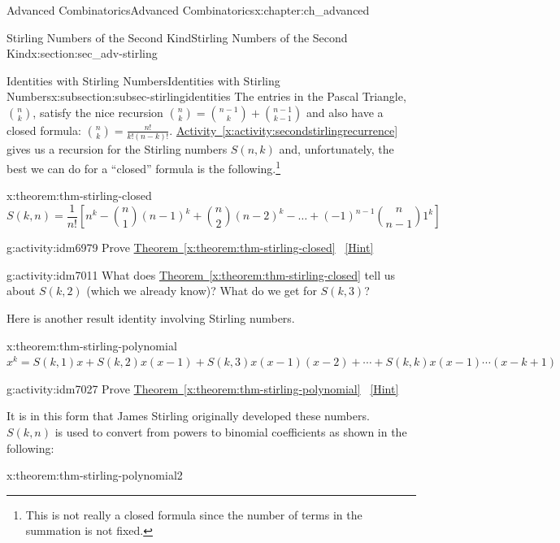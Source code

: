 \documentclass[oneside,10pt,]{book}
\numberwithin{equation}{chapter}
\begin{document}
\begin{chapterptx}{Advanced Combinatorics}{}{Advanced Combinatorics}{}{}{x:chapter:ch_advanced}
\begin{sectionptx}{Stirling Numbers of the Second Kind}{}{Stirling Numbers of the Second Kind}{}{}{x:section:sec_adv-stirling}
\begin{subsectionptx}{Identities with Stirling Numbers}{}{Identities with Stirling Numbers}{}{}{x:subsection:subsec-stirlingidentities}
The entries in the Pascal Triangle, \(\binom{n}{k}\), satisfy the nice recursion \(\binom{n}{k} = \binom{n - 1}{k} + \binom{n - 1}{k - 1}\) and also have a closed formula: \(\binom{n}{k} = \frac{n!}{k!(n - k)!}\). \hyperref[x:activity:secondstirlingrecurrence]{Activity~\ref{x:activity:secondstirlingrecurrence}} gives us a recursion for the Stirling numbers \(S(n,k)\) and, unfortunately, the best we can do for a ``closed'' formula is the following.\footnote{This is not really a closed formula since the number of terms in the summation is not fixed.\label{g:fn:idm6974}}%
\begin{theorem}{}{}{x:theorem:thm-stirling-closed}%
%
\begin{equation*}
S(k,n) = \frac{1}{n!}\left[n^{k} - \binom{n}{1} \left( n - 1 \right)^{k} + \binom{n}{2} \left( n - 2 \right)^{k} - \ldots + \left( - 1 \right)^{n - 1}\binom{n}{n - 1} 1^{k} \right] 
\end{equation*}
%
\end{theorem}
\begin{activity}{}{g:activity:idm6979}%
Prove \hyperref[x:theorem:thm-stirling-closed]{Theorem~\ref{x:theorem:thm-stirling-closed}}%
\qquad~\hfill{\tiny\hyperlink{g:hint:idm6983-back}{[Hint]}}\end{activity}
\begin{activity}{}{g:activity:idm7011}%
What does \hyperref[x:theorem:thm-stirling-closed]{Theorem~\ref{x:theorem:thm-stirling-closed}} tell us about \(S(k, 2)\) (which we already know)?  What do we get for \(S(k,3)\)?%
\end{activity}
Here is another result identity involving Stirling numbers.%
\begin{theorem}{}{}{x:theorem:thm-stirling-polynomial}%
\(x^{k} = S\left(k,1 \right)x + S\left(k,2 \right)x\left( x - 1 \right) + S\left(k,3 \right)x\left( x - 1 \right)\left( x - 2 \right) + \cdots
+ S\left(k,k \right)x\left( x - 1 \right)\cdots(x -k + 1)\)%
\end{theorem}
\begin{activity}{}{g:activity:idm7027}%
Prove \hyperref[x:theorem:thm-stirling-polynomial]{Theorem~\ref{x:theorem:thm-stirling-polynomial}}%
\qquad~\hfill{\tiny\hyperlink{g:hint:idm7031-back}{[Hint]}}\end{activity}
It is in this form that James Stirling originally developed these numbers. \(S(k,n)\) is used to convert from powers to binomial  coefficients as shown in the following:%
\begin{theorem}{}{}{x:theorem:thm-stirling-polynomial2}%

\end{theorem}
\end{subsectionptx}
\end{sectionptx}
\end{chapterptx}
\end{document}
